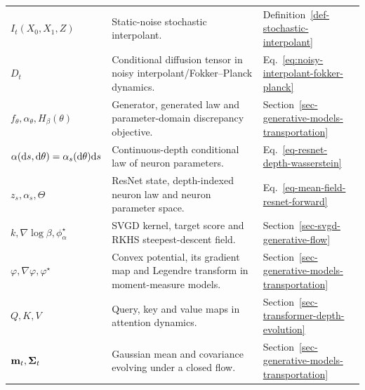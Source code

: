 {\begin{longtable}{>{\raggedright\arraybackslash}p{}
                  >{\raggedright\arraybackslash}p{}
                  >{\raggedright\arraybackslash}p{}}
$I_t(X_0,X_1,Z)$ & Static-noise stochastic interpolant. & Definition~\ref{def-stochastic-interpolant} \\
$D_t$ & Conditional diffusion tensor in noisy interpolant/Fokker--Planck dynamics. & Eq.~\eqref{eq:noisy-interpolant-fokker-planck} \\
$f_\theta,\alpha_\theta,H_\beta(\theta)$ & Generator, generated law and parameter-domain discrepancy objective. & Section~\ref{sec-generative-models-transportation} \\
$\alpha(\mathrm{d} s,\mathrm{d}\theta)=\alpha_s(\mathrm{d}\theta)\mathrm{d} s$ & Continuous-depth conditional law of neuron parameters. & Eq.~\eqref{eq-resnet-depth-wasserstein} \\
$z_s,\alpha_s,\Theta$ & ResNet state, depth-indexed neuron law and neuron parameter space. & Eq.~\eqref{eq-mean-field-resnet-forward} \\
$k,\nabla\log\beta,\phi_\alpha^\star$ & SVGD kernel, target score and RKHS steepest-descent field. & Section~\ref{sec-svgd-generative-flow} \\
$\varphi,\nabla\varphi,\varphi^\star$ & Convex potential, its gradient map and Legendre transform in moment-measure models. & Section~\ref{sec-generative-models-transportation} \\
$Q,K,V$ & Query, key and value maps in attention dynamics. & Section~\ref{sec-transformer-depth-evolution} \\
$\mathbf{m}_t,\mathbf{\Sigma}_t$ & Gaussian mean and covariance evolving under a closed flow. & Section~\ref{sec-generative-models-transportation} \\
\end{longtable}
}
